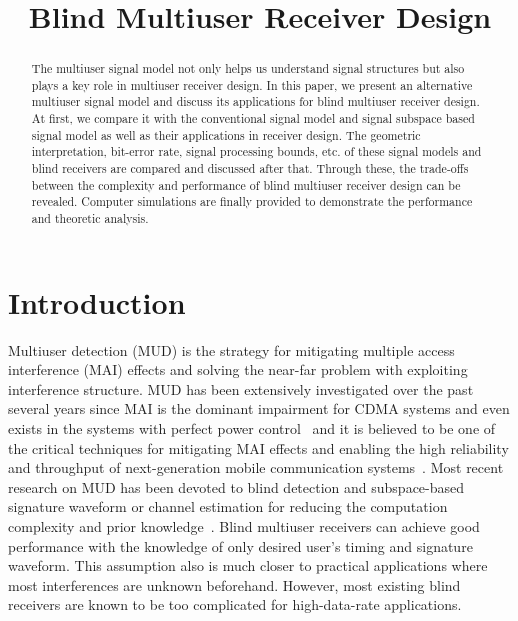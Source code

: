 \documentclass[conference]{IEEEtran}
\begin{document}
\title{Blind Multiuser Receiver Design}

\author{
 \and
{}
}

\date{}
\maketitle
\begin{abstract}\small
The multiuser signal model not only helps us understand signal
structures but also plays a key role in multiuser receiver design.
In this paper, we present an alternative multiuser signal model
and discuss its applications for blind multiuser receiver design.
At first, we compare it with the conventional signal model and
signal subspace based signal model as well as their applications
in receiver design. The geometric interpretation, bit-error rate,
signal processing bounds, etc. of these signal models and blind
receivers are compared and discussed after that. Through these,
the trade-offs between the complexity and performance of blind
multiuser receiver design can be revealed. Computer simulations
are finally provided to demonstrate the performance and theoretic
analysis.
\end{abstract}

\section{Introduction}
Multiuser detection (MUD) is the strategy for mitigating multiple
access interference (MAI) effects and solving the near-far problem
with exploiting interference structure. MUD has been extensively
investigated over the past several years since MAI is the dominant
impairment for CDMA systems and even exists in the systems with
perfect power control~\cite{Verd98} and it is believed to be one
of the critical techniques for mitigating MAI effects and enabling
the high reliability and throughput of next-generation mobile
communication systems~\cite{Andr05}. Most recent research on MUD
has been devoted to blind detection and subspace-based signature
waveform or channel estimation for reducing the computation
complexity and prior
knowledge~\cite{Honi95,Torl97,Wang98,Zhang02,Wang03d,Wang05A,Wang05B}.
Blind multiuser receivers can achieve good performance with the
knowledge of only desired user's timing and signature waveform.
This assumption also is much closer to practical applications
where most interferences are unknown beforehand. However, most
existing blind receivers are known to be too complicated for
high-data-rate applications.
\end{document}
